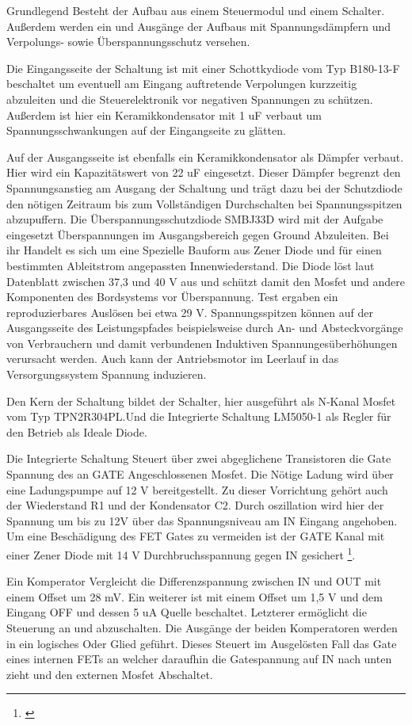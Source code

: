 Grundlegend Besteht der Aufbau aus einem Steuermodul und einem Schalter. Außerdem werden ein und Ausgänge der Aufbaus mit Spannungsdämpfern und Verpolungs- sowie Überspannungsschutz versehen.

Die Eingangsseite der Schaltung ist mit einer Schottkydiode vom Typ B180-13-F beschaltet um eventuell am Eingang auftretende Verpolungen kurzzeitig abzuleiten und die Steuerelektronik vor negativen Spannungen zu schützen. Außerdem ist hier ein Keramikkondensator mit 1 uF verbaut um Spannungsschwankungen auf der Eingangseite zu glätten.

Auf der Ausgangsseite ist ebenfalls ein Keramikkondensator als Dämpfer verbaut. Hier wird ein Kapazitätswert von 22 uF eingesetzt. Dieser Dämpfer begrenzt den Spannungsanstieg am Ausgang der Schaltung und trägt dazu bei der Schutzdiode den nötigen Zeitraum bis zum Vollständigen Durchschalten bei Spannungsspitzen abzupuffern.
Die Überspannungsschutzdiode SMBJ33D wird mit der Aufgabe eingesetzt Überspannungen im Ausgangsbereich gegen Ground Abzuleiten. Bei ihr Handelt es sich um eine Spezielle Bauform aus Zener Diode und für einen bestimmten Ableitstrom angepassten Innenwiederstand. Die Diode löst laut Datenblatt zwischen 37,3 und 40 V aus und schützt damit den Mosfet und andere Komponenten des Bordsystems vor Überspannung. Test ergaben ein reproduzierbares Auslösen bei  etwa 29 V. Spannungsspitzen können auf der Ausgangsseite des Leistungspfades beispielsweise durch An- und Absteckvorgänge von Verbrauchern und damit verbundenen Induktiven Spannungesüberhöhungen verursacht werden. Auch kann der Antriebsmotor im Leerlauf in das Versorgungssystem Spannung induzieren.

Den Kern der Schaltung bildet der Schalter, hier ausgeführt als N-Kanal Mosfet vom Typ TPN2R304PL.Und die Integrierte Schaltung LM5050-1 als Regler für den Betrieb als Ideale Diode.

Die Integrierte Schaltung Steuert über zwei abgeglichene Transistoren die Gate Spannung des an GATE Angeschlossenen Mosfet. Die Nötige Ladung wird über eine Ladungspumpe auf 12 V bereitgestellt. Zu dieser Vorrichtung gehört auch der Wiederstand R1 und der Kondensator C2.
Durch oszillation wird hier der Spannung um bis zu 12V  über das Spannungsniveau am IN Eingang angehoben. Um eine Beschädigung des FET Gates zu vermeiden ist der GATE Kanal mit einer Zener Diode mit 14 V Durchbruchsspannung gegen IN gesichert \footnote{\cite[Seite~12.]{LM5050-1}}.

Ein Komperator Vergleicht die Differenzspannung zwischen IN und OUT mit einem Offset um 28 mV. Ein weiterer ist mit einem Offset um 1,5 V und dem Eingang OFF und dessen 5 uA Quelle beschaltet. Letzterer ermöglicht die Steuerung an und abzuschalten. Die Ausgänge der beiden Komperatoren werden in ein logisches Oder Glied geführt. Dieses Steuert im Ausgelösten Fall das Gate eines internen FETs an welcher daraufhin die Gatespannung auf IN nach unten zieht und den externen Mosfet Abschaltet. 

